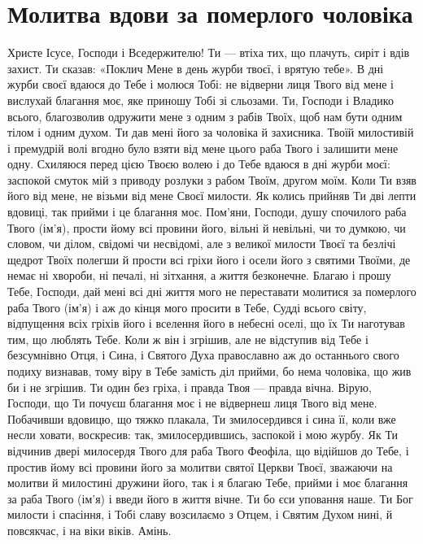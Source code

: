 \documentclass[chapters.tex]{subfiles}
\begin{document}
\section{Молитва вдови за померлого чоловіка}
Христе Ісусе, Господи і Вседержителю! Ти — втіха тих, що плачуть, сиріт і вдів захист. Ти сказав: «Поклич Мене в день журби твоєї, і врятую тебе». В дні журби своєї вдаюся до Тебе і молюся Тобі: не відверни лиця Твого від мене і вислухай благання моє, яке приношу Тобі зі сльозами. Ти, Господи і Владико всього, благозволив одружити мене з одним з рабів Твоїх, щоб нам бути одним тілом і одним духом. Ти дав мені його за чоловіка й захисника. Твоїй милостивій і премудрій волі вгодно було взяти від мене цього раба Твого і залишити мене одну. Схиляюся перед цією Твоєю волею і до Тебе вдаюся в дні журби моєї: заспокой смуток мій з приводу розлуки з рабом Твоїм, другом моїм. Коли Ти взяв його від мене, не візьми від мене Своєї милости. Як колись прийняв Ти дві лепти вдовиці, так прийми і це благання моє. Пом’яни, Господи, душу спочилого раба Твого (ім’я), прости йому всі провини його, вільні й невільні, чи то думкою, чи словом, чи ділом, свідомі чи несвідомі, але з великої милости Твоєї та безлічі щедрот Твоїх полегши й прости всі гріхи його і осели його з святими Твоїми, де немає ні хвороби, ні печалі, ні зітхання, а життя безконечне. Благаю і прошу Тебе, Господи, дай мені всі дні життя мого не переставати молитися за померлого раба Твого (ім’я) і аж до кінця мого просити в Тебе, Судді всього світу, відпущення всіх гріхів його і вселення його в небесні оселі, що їх Ти наготував тим, що люблять Тебе. Коли ж він і згрішив, але не відступив від Тебе і безсумнівно Отця, і Сина, і Святого Духа православно аж до останнього свого подиху визнавав, тому віру в Тебе замість діл прийми, бо нема чоловіка, що жив би і не згрішив. Ти один без гріха, і правда Твоя — правда вічна. Вірую, Господи, що Ти почуєш благання моє і не відвернеш лиця Твого від мене. Побачивши вдовицю, що тяжко плакала, Ти змилосердився і сина її, коли вже несли ховати, воскресив: так, змилосердившись, заспокой і мою журбу. Як Ти відчинив двері милосердя Твого для раба Твого Феофіла, що відійшов до Тебе, і простив йому всі провини його за молитви святої Церкви Твоєї, зважаючи на молитви й милостині дружини його, так і я благаю Тебе, прийми і моє благання за раба Твого (ім’я) і введи його в життя вічне. Ти бо єси уповання наше. Ти Бог милости і спасіння, і Тобі славу возсилаємо з Отцем, і Святим Духом нині, й повсякчас, і на віки віків. Амінь.
\end{document}
